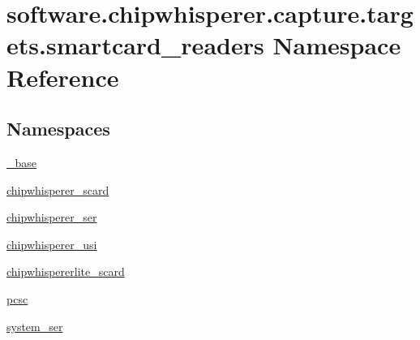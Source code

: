 \hypertarget{namespacesoftware_1_1chipwhisperer_1_1capture_1_1targets_1_1smartcard__readers}{}\section{software.\+chipwhisperer.\+capture.\+targets.\+smartcard\+\_\+readers Namespace Reference}
\label{namespacesoftware_1_1chipwhisperer_1_1capture_1_1targets_1_1smartcard__readers}
\subsection*{Namespaces}
\begin{DoxyCompactItemize}
\item 
 \hyperlink{namespacesoftware_1_1chipwhisperer_1_1capture_1_1targets_1_1smartcard__readers_1_1__base}{\+\_\+base}
\item 
 \hyperlink{namespacesoftware_1_1chipwhisperer_1_1capture_1_1targets_1_1smartcard__readers_1_1chipwhisperer__scard}{chipwhisperer\+\_\+scard}
\item 
 \hyperlink{namespacesoftware_1_1chipwhisperer_1_1capture_1_1targets_1_1smartcard__readers_1_1chipwhisperer__ser}{chipwhisperer\+\_\+ser}
\item 
 \hyperlink{namespacesoftware_1_1chipwhisperer_1_1capture_1_1targets_1_1smartcard__readers_1_1chipwhisperer__usi}{chipwhisperer\+\_\+usi}
\item 
 \hyperlink{namespacesoftware_1_1chipwhisperer_1_1capture_1_1targets_1_1smartcard__readers_1_1chipwhispererlite__scard}{chipwhispererlite\+\_\+scard}
\item 
 \hyperlink{namespacesoftware_1_1chipwhisperer_1_1capture_1_1targets_1_1smartcard__readers_1_1pcsc}{pcsc}
\item 
 \hyperlink{namespacesoftware_1_1chipwhisperer_1_1capture_1_1targets_1_1smartcard__readers_1_1system__ser}{system\+\_\+ser}
\end{DoxyCompactItemize}
